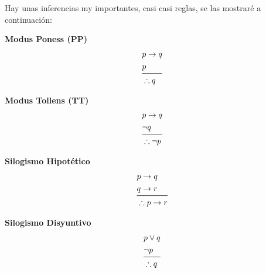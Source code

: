 \documentclass[12pt, fleqn]{report}                             %
\theoremstyle{break}                                            %
\begin{document}
            Hay unas inferencias my importantes, casi casi reglas, se las mostraré a continuación:\\

            \begin{multicols}{2}
                
                \large{\textbf{Modus Poness (PP)}}
                    \begin{equation*}
                    \begin{split}
                        &p \to q        \\
                        &p              \\
                        \midrule
                        &\therefore q
                    \end{split}
                    \end{equation*}

                \large{\textbf{Modus Tollens (TT)}}
                    \begin{equation*}
                    \begin{split}
                        &p \to q        \\
                        &\lnot q        \\
                        \midrule
                        &\therefore \lnot p
                    \end{split}
                    \end{equation*}

            \end{multicols}

            \bigskip

            \begin{multicols}{2}
                
                \large{\textbf{Silogismo Hipotético}}
                    \begin{equation*}
                    \begin{split}
                        &p \to q        \\
                        &q \to r        \\
                        \midrule
                        &\therefore p \to r
                    \end{split}
                    \end{equation*}

                \large{\textbf{Silogismo Disyuntivo}}
                    \begin{equation*}
                    \begin{split}
                        &p \lor q       \\
                        &\lnot p        \\
                        \midrule
                        &\therefore q
                    \end{split}
                    \end{equation*}

            \end{multicols}
\end{document}
